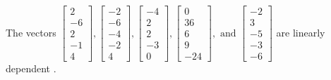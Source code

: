\begin{exercise}
\begin{exerciseStatement}
  \end{exerciseStatement}
  \begin{exerciseAnswer}
   The vectors \(\left[\begin{array}{r}
2 \\
-6 \\
2 \\
-1 \\
4
\end{array}\right] , \left[\begin{array}{r}
-2 \\
-6 \\
-4 \\
-2 \\
4
\end{array}\right] , \left[\begin{array}{r}
-4 \\
2 \\
2 \\
-3 \\
0
\end{array}\right] , \left[\begin{array}{r}
0 \\
36 \\
6 \\
9 \\
-24
\end{array}\right] , \text{ and } \left[\begin{array}{r}
-2 \\
3 \\
-5 \\
-3 \\
-6
\end{array}\right]\) are 
  	 linearly dependent  .
  


  \end{exerciseAnswer}
\end{exercise}